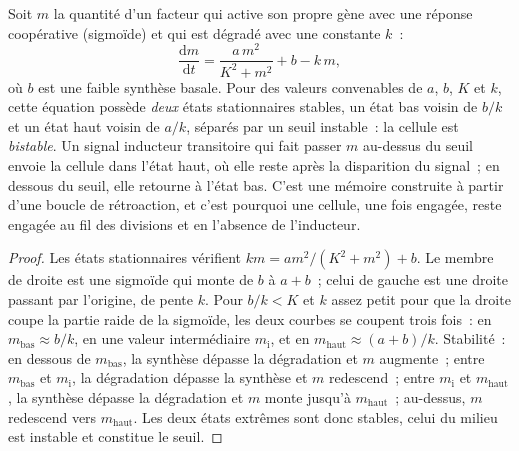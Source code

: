 \begin{theorem}\label{thm:b2:cell-differentiation:switch}
Soit $m$ la quantité d'un facteur qui active son propre gène avec une
réponse coopérative (sigmoïde) et qui est dégradé avec une constante $k$~:
\[
\frac{\mathrm{d}m}{\mathrm{d}t} = \frac{a\,m^{2}}{K^{2} + m^{2}} + b - k\,m,
\]
où $b$ est une faible synthèse basale. Pour des valeurs convenables de
$a$, $b$, $K$ et
$k$, cette équation possède \emph{deux} états stationnaires stables, un
état bas voisin de $b/k$ et un état haut voisin de $a/k$, séparés par un
seuil instable~: la cellule est \emph{bistable}. Un signal inducteur
transitoire qui fait passer $m$ au-dessus du seuil envoie la cellule
dans l'état haut, où elle reste après la disparition du signal~; en
dessous du seuil, elle retourne à l'état bas. C'est une mémoire
construite à partir d'une boucle de rétroaction, et c'est pourquoi une
cellule, une fois engagée, reste engagée au fil des divisions et en
l'absence de l'inducteur.
\end{theorem}
\begin{proof}
Les états stationnaires vérifient $k m = a m^{2}/(K^{2} + m^{2}) + b$. Le
membre de droite est une sigmoïde qui monte de $b$ à $a + b$~; celui de
gauche est une droite passant par l'origine, de pente $k$. Pour
$b/k < K$ et $k$ assez petit pour que la droite coupe la partie raide
de la sigmoïde, les deux courbes se coupent trois fois~: en
$m_{\text{bas}} \approx b/k$, en une valeur intermédiaire
$m_{\text{i}}$, et en $m_{\text{haut}} \approx (a +
b)/k$. Stabilité~: en dessous de $m_{\text{bas}}$, la synthèse dépasse
la dégradation et $m$ augmente~; entre $m_{\text{bas}}$ et
$m_{\text{i}}$, la dégradation dépasse la synthèse et $m$ redescend~;
entre $m_{\text{i}}$ et
$m_{\text{haut}}$, la synthèse dépasse la dégradation et $m$ monte
jusqu'à $m_{\text{haut}}$~; au-dessus, $m$ redescend vers
$m_{\text{haut}}$. Les deux états extrêmes sont donc stables, celui du
milieu est instable et constitue le seuil.
\end{proof}

